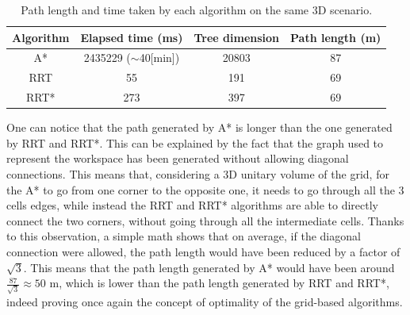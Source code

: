 \begin{table}[H]
    \centering
    \begin{tabular}{|c|c|c|c|}
        \hline
        \textbf{Algorithm} & \textbf{Elapsed time (ms)} & \textbf{Tree dimension} & \textbf{Path length (m)} \\
        \hline
        A*                 & 2435229 ($\sim$40[min])    & 20803                   & 87                       \\
        RRT                & 55                         & 191                     & 69                       \\
        RRT*               & 273                        & 397                     & 69                       \\
        \hline
    \end{tabular}
    \caption{Path length and time taken by each algorithm on the same 3D scenario.}
    \label{tab:3D_grid_vs_sample_based}
\end{table}

One can notice that the path generated by A* is longer than the one generated by RRT and RRT*.
This can be explained by the fact that the graph used to represent the workspace has been generated without allowing diagonal connections.
This means that, considering a 3D unitary volume of the grid, for the A* to go from one corner to the opposite one, it needs to go through all the 3 cells edges, while instead the RRT and RRT* algorithms are able to directly connect the two corners, without going through all the intermediate cells.
Thanks to this observation, a simple math shows that on average, if the diagonal connection were allowed, the path length would have been reduced by a factor of $\sqrt{3}$.
This means that the path length generated by A* would have been around $\frac{87}{\sqrt{3}} \approx 50$ m, which is lower than the path length generated by RRT and RRT*, indeed proving once again the concept of optimality of the grid-based algorithms.


